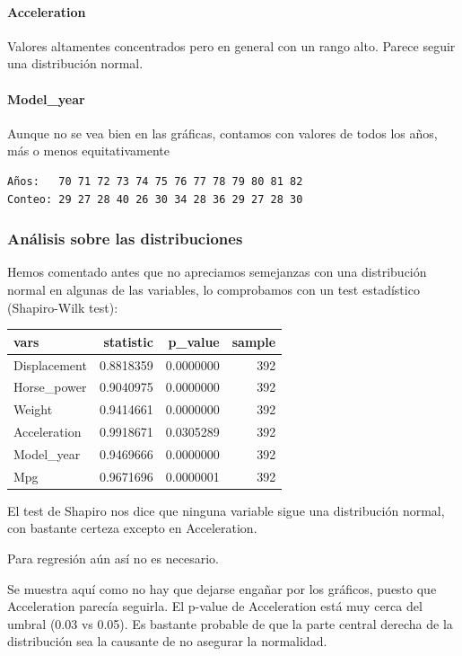 \paragraph{Acceleration}

Valores altamentes concentrados pero en general con un rango alto.
Parece seguir una distribución normal.


\paragraph{Model\_year}

Aunque no se vea bien en las gráficas, contamos con valores de todos los
años, más o menos equitativamente

\begin{verbatim}
Años:   70 71 72 73 74 75 76 77 78 79 80 81 82 
Conteo: 29 27 28 40 26 30 34 28 36 29 27 28 30 
\end{verbatim}


\subsubsection{Análisis sobre las distribuciones}

Hemos comentado antes que no apreciamos semejanzas con una distribución normal en algunas de las variables, lo comprobamos con un test estadístico (Shapiro-Wilk test):

\begin{tabular}{l|r|r|r}
\hline
vars & statistic & p\_value & sample\\
\hline
Displacement & 0.8818359 & 0.0000000 & 392\\
\hline
Horse\_power & 0.9040975 & 0.0000000 & 392\\
\hline
Weight & 0.9414661 & 0.0000000 & 392\\
\hline
Acceleration & 0.9918671 & 0.0305289 & 392\\
\hline
Model\_year & 0.9469666 & 0.0000000 & 392\\
\hline
Mpg & 0.9671696 & 0.0000001 & 392\\
\hline
\end{tabular}

El test de Shapiro nos dice que ninguna variable sigue una distribución normal, con bastante certeza excepto en Acceleration.

Para regresión aún así no es necesario.

Se muestra aquí como no hay que dejarse engañar por los gráficos, puesto que Acceleration parecía seguirla. El p-value de Acceleration está muy cerca del umbral (0.03 vs 0.05). Es bastante probable de que la parte central derecha de la distribución sea la causante de no asegurar la normalidad.

